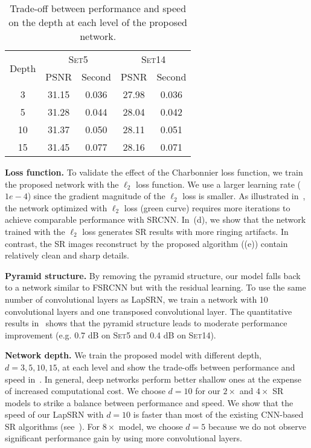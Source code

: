 \documentclass[10pt,twocolumn,letterpaper]{article}
\begin{document}
	\begin{table}[t]
		\centering
		\caption{
			Trade-off between performance and speed on the depth at each level of the proposed network.
		}
		\vspace{-2mm}
		\begin{tabular}{c|cccc}
			\toprule
			\multirow{2}{*}{Depth} & 
			\multicolumn{2}{c}{\textsc{Set5}} & 
			\multicolumn{2}{c}{\textsc{Set14}} \\ 
			& PSNR & Second & PSNR & Second \\ \midrule
			3 & 31.15 & 0.036 & 27.98 & 0.036 \\
			5 & 31.28 & 0.044 & 28.04 & 0.042 \\
			10 & 31.37 & 0.050 & 28.11 & 0.051 \\
			15 & 31.45 & 0.077 & 28.16 & 0.071 \\
			\bottomrule
		\end{tabular}
		\label{tab:depth_speed}
		\vspace{-5mm}
	\end{table}
	
	
	
	\noindent\textbf{Loss function.} 
	To validate the effect of the Charbonnier loss function, we train the proposed network with the $\ell_2$ loss function.
	We use a larger learning rate ($1e-4$) since the gradient magnitude of the $\ell_2$ loss is smaller. 
	As illustrated in~, the network optimized with $\ell_2$ loss (green curve) requires more iterations to achieve comparable performance with SRCNN. 
	In~(d), we show that the network trained with the $\ell_2$ loss generates SR results with more ringing artifacts. 
	In contrast, the SR images reconstruct by the proposed algorithm ((e)) contain relatively clean and sharp details. 
	
	
	\noindent\textbf{Pyramid structure.}
	By removing the pyramid structure, our model falls back to a network similar to FSRCNN but with the residual learning.
	To use the same number of convolutional layers as LapSRN, we train a network with 10 convolutional layers and one transposed convolutional layer.
	The quantitative results in~ shows that the pyramid structure leads to moderate performance improvement (e.g. 0.7 dB on \textsc{Set5} and 0.4 dB on \textsc{Set14}). 
	
	
	\noindent\textbf{Network depth.} 
	We train the proposed model with different depth, $d = 3, 5, 10, 15$, at each level and show the trade-offs between performance and speed in~.
	In general, deep networks perform better shallow ones at the expense of increased computational cost.
	We choose $d = 10$ for our $2\times$ and $4\times$ SR models to strike a balance between performance and speed.
	We show that the speed of our LapSRN with $d = 10$ is faster than most of the existing CNN-based SR algorithms (see~).
	For $8\times$ model, we choose $d = 5$ because we do not observe significant performance gain by using more convolutional layers.
	
\end{document}
